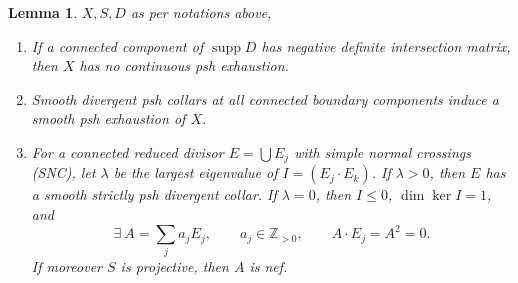 \documentclass[11pt]{amsart}
\newtheorem{lemma}[theorem]{Lemma}
\theoremstyle{definition}
\theoremstyle{remark}
\numberwithin{equation}{section}
\newcommand{\supp}{\operatorname{supp}}
\begin{document}
\begin{lemma}\label{lem:surface-boundary-tools}
$X, S, D$ as per notations above,
\begin{enumerate}[label=\textup{(\roman*)},leftmargin=2.5em]
\item\label{item:negative-boundary}
If a connected component of $\supp D$ has negative definite
intersection matrix, then $X$ has no continuous psh exhaustion.
\item\label{item:collar-gluing}
Smooth divergent psh collars at all connected boundary components
induce a smooth psh exhaustion of $X$.
\item\label{item:matrix-alternatives}
For a connected reduced divisor $E=\bigcup E_j$ with simple normal
crossings (SNC), let $\lambda$
be the largest eigenvalue of $I=(E_j\cdot E_k)$. If $\lambda>0$,
then $E$ has a smooth strictly psh divergent collar. If $\lambda=0$,
then $I\le0$, $\dim\ker I=1$, and
\begin{equation}\label{eq:surface-null-boundary}
 \exists~A=\sum_j a_jE_j,\qquad a_j\in\mathbb Z_{>0},\qquad
 A\cdot E_j=A^2=0.
\end{equation}
If moreover $S$ is projective, then $A$ is nef.
\end{enumerate}
\end{lemma}
\end{document}
